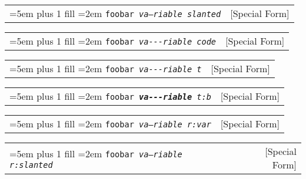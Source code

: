 \documentclass{book}
\newcommand\GNUTexinfocommandstyletextvar[1]{{\normalfont{}\textsl{#1}}}%
\begin{document}
%

\noindent\begin{tabularx}{\linewidth}{@{}Xr}
\rightskip=5em plus 1 fill
\hangindent=2em
\texttt{foobar \EmbracOn{}\textnormal{\textsl{\textsl{va---riable} slanted}}\EmbracOff{}}& [Special Form]
\end{tabularx}

%

\noindent\begin{tabularx}{\linewidth}{@{}Xr}
\rightskip=5em plus 1 fill
\hangindent=2em
\texttt{foobar \EmbracOn{}\textnormal{\textsl{\texttt{va{-}{-}{-}riable} code}}\EmbracOff{}}& [Special Form]
\end{tabularx}

%

\noindent\begin{tabularx}{\linewidth}{@{}Xr}
\rightskip=5em plus 1 fill
\hangindent=2em
\texttt{foobar \EmbracOn{}\textnormal{\textsl{\texttt{va{-}{-}{-}riable} t}}\EmbracOff{}}& [Special Form]
\end{tabularx}

%

\noindent\begin{tabularx}{\linewidth}{@{}Xr}
\rightskip=5em plus 1 fill
\hangindent=2em
\texttt{foobar \EmbracOn{}\textnormal{\textsl{\texttt{\textbf{va{-}{-}{-}riable}} t:b}}\EmbracOff{}}& [Special Form]
\end{tabularx}

%

\noindent\begin{tabularx}{\linewidth}{@{}Xr}
\rightskip=5em plus 1 fill
\hangindent=2em
\texttt{foobar \EmbracOn{}\textnormal{\textsl{\EmbracOff{}\textnormal{\GNUTexinfocommandstyletextvar{va---riable}}\EmbracOn{} r:var}}\EmbracOff{}}& [Special Form]
\end{tabularx}

%

\noindent\begin{tabularx}{\linewidth}{@{}Xr}
\rightskip=5em plus 1 fill
\hangindent=2em
\texttt{foobar \EmbracOn{}\textnormal{\textsl{\EmbracOff{}\textnormal{\textsl{va---riable}}\EmbracOn{} r:slanted}}\EmbracOff{}}& [Special Form]
\end{tabularx}

%
\end{document}
